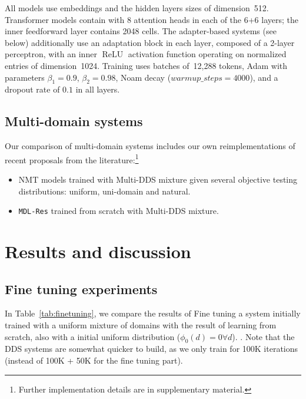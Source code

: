 \documentclass[11pt,a4paper]{article}
\newcommand{\fyTodo}[1]{\Todo[FY:]{\textcolor{orange}{#1}}}
\newcommand{\revision}[1]{#1}
\newcommand{\system}[1]{\texttt{{#1}}}
\begin{document}
All models use embeddings and the hidden layers sizes of dimension~512. Transformer models contain with 8 attention heads in each of the 6+6 layers; the inner feedforward layer contains 2048 cells. The adapter-based systems (see below) additionally use an adaptation block in each layer, composed of a 2-layer perceptron, with an inner $\operatorname{ReLU}$ activation function operating on normalized entries of dimension~1024. 
Training uses batches of~12,288 tokens, Adam with parameters $\beta_1=0.9$, $\beta_2= 0.98$, Noam decay ($warmup\_steps=4000$), and a dropout rate of $0.1$ in all layers.

\subsection{Multi-domain systems} \label{ssec:mdsys}

Our comparison of multi-domain systems includes our own reimplementations of recent proposals from the literature:\footnote{\revision{Further implementation details are in supplementary material.}}
\begin{itemize}
\itemsep0em 
\item NMT models trained with Multi-DDS mixture given several objective testing distributions: uniform, uni-domain and natural.
\item \system{MDL-Res} trained from scratch with Multi-DDS mixture.
\end{itemize}

\section{Results and discussion \label{sec:results}}

\subsection{Fine tuning experiments}

\fyTodo{Fix the table}
In Table~\ref{tab:finetuning}, we compare the results of Fine tuning a system initially trained with a uniform mixture of domains with the result of learning from scratch, also with a initial uniform distribution ($\phi_0(d) = 0 \forall d$). \fyTodo{What do we see ? How about domain proximity ? - show a graph}. Note that the DDS systems are somewhat quicker to build, as we only train for 100K iterations (instead of 100K + 50K for the fine tuning part).
\end{document}
